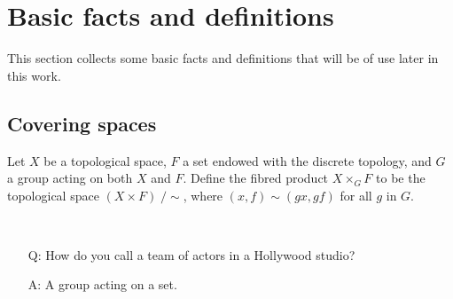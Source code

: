 \section{Basic facts and definitions}

This section collects some basic facts and definitions that will be of use later in this work.

\iffalse
\subsection{Algebraic Curves}


\begin{defi}
 The \emph{$n$-dimensional affine space} is the set $\Abb^n$ of $n$-tuples with entries in $\Cbb$.
\end{defi}

\begin{defi}
 For an ideal $J\subset \Cbb[x_1,\ldots,x_n]$ we define the \emph{zero set $V(J)$ of $J$} as the set of points $p \in \Cbb$. For a subset 
$X\subset \Abb^n$ we define the \emph{ideal $I(V)$ of $X$} as usual.
\end{defi}
\fi

\subsection{Covering spaces} \label{sec:covering-spaces}

\begin{defi}
 Let $X$ be a topological space, $F$ a set endowed with the discrete topology, and $G$ a group acting on both $X$ and $F$. Define the fibred product $X \times_{G} F$ to be the topological space $(X\times F)\; /\sim$, where $(x,f)\sim (gx,gf)$ for all $g$ in $G$.
\end{defi}

\begin{joke} \ 
 \begin{enumerate}
 \item [Q: ] How do you call a team of actors in a Hollywood studio?
 \item [A: ] A group acting on a set.
 \end{enumerate}
\end{joke}
\fi

